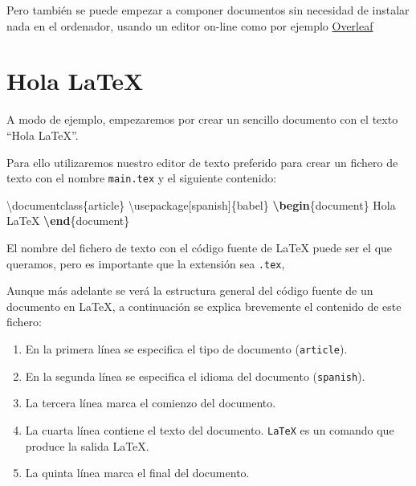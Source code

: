 \documentclass[
  spanish,
  a4paper,
]{scrreport}
\newenvironment{Shaded}{\begin{snugshade}}{\end{snugshade}}
\newcommand{\BuiltInTok}[1]{\textcolor[rgb]{0.00,0.23,0.31}{#1}}
\newcommand{\ExtensionTok}[1]{\textcolor[rgb]{0.00,0.23,0.31}{#1}}
\newcommand{\KeywordTok}[1]{\textcolor[rgb]{0.00,0.23,0.31}{\textbf{#1}}}
\newcommand{\NormalTok}[1]{\textcolor[rgb]{0.00,0.23,0.31}{#1}}
\providecommand{\tightlist}{%
  \setlength{\itemsep}{0pt}\setlength{\parskip}{0pt}}
\theoremstyle{definition}
\theoremstyle{remark}
\begin{document}
Pero también se puede empezar a componer documentos sin necesidad de
instalar nada en el ordenador, usando un editor on-line como por ejemplo
\href{https://www.overleaf.com/}{Overleaf}

\section{Hola LaTeX}\label{hola-latex}

A modo de ejemplo, empezaremos por crear un sencillo documento con el
texto ``Hola LaTeX''.

Para ello utilizaremos nuestro editor de texto preferido para crear un
fichero de texto con el nombre \texttt{main.tex} y el siguiente
contenido:

\begin{Shaded}
\begin{Highlighting}[]
\BuiltInTok{\textbackslash{}documentclass}\NormalTok{\{}\ExtensionTok{article}\NormalTok{\}}
\BuiltInTok{\textbackslash{}usepackage}\NormalTok{[spanish]\{}\ExtensionTok{babel}\NormalTok{\}}
\KeywordTok{\textbackslash{}begin}\NormalTok{\{}\ExtensionTok{document}\NormalTok{\}}
\NormalTok{Hola LaTeX}
\KeywordTok{\textbackslash{}end}\NormalTok{\{}\ExtensionTok{document}\NormalTok{\}}
\end{Highlighting}
\end{Shaded}

\begin{tcolorbox}[enhanced jigsaw, arc=.35mm, bottomrule=.15mm, bottomtitle=1mm, breakable, colback=white, colbacktitle=quarto-callout-important-color!10!white, colframe=quarto-callout-important-color-frame, coltitle=black, left=2mm, leftrule=.75mm, opacityback=0, opacitybacktitle=0.6, rightrule=.15mm, title=\textcolor{quarto-callout-important-color}{\faExclamation}\hspace{0.5em}{Importante}, titlerule=0mm, toprule=.15mm, toptitle=1mm]

El nombre del fichero de texto con el código fuente de LaTeX puede ser
el que queramos, pero es importante que la extensión sea \texttt{.tex},

\end{tcolorbox}

Aunque más adelante se verá la estructura general del código fuente de
un documento en LaTeX, a continuación se explica brevemente el contenido
de este fichero:

\begin{enumerate}
\def\labelenumi{\arabic{enumi}.}
\tightlist
\item
  En la primera línea se especifica el tipo de documento
  (\texttt{article}).
\item
  En la segunda línea se especifica el idioma del documento
  (\texttt{spanish}).
\item
  La tercera línea marca el comienzo del documento.
\item
  La cuarta línea contiene el texto del documento. \texttt{LaTeX} es un
  comando que produce la salida LaTeX.
\item
  La quinta línea marca el final del documento.
\end{enumerate}
\end{document}

